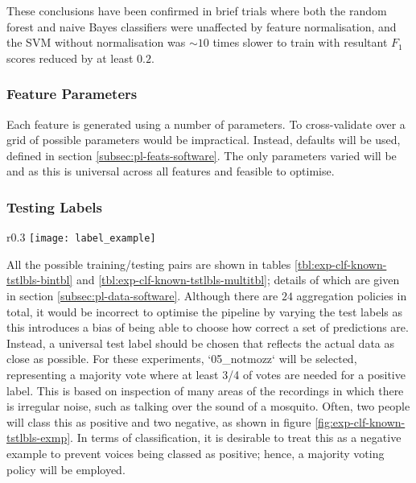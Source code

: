             These conclusions have been confirmed in brief trials where both the random forest and naive Bayes classifiers were unaffected by feature normalisation, and the SVM without normalisation was $\sim10$ times slower to train with resultant $F_{1}$ scores reduced by at least $0.2$.
    
            
        \subsubsection{Feature Parameters}
        \label{subsubsec:exp-clf-known-featparam}
            Each feature is generated using a number of parameters. To cross-validate over a grid of possible parameters would be impractical. Instead, defaults will be used, defined in section \ref{subsec:pl-feats-software}. The only parameters varied will be  and  as this is universal across all features and feasible to optimise.
        
        \subsubsection{Testing Labels}
        \label{subsubsec:exp-clf-known-tstlbls}
            \begin{wrapfigure}{r}{0.3\textwidth}
                \centering
                \texttt{[image: label\_example]}
                \caption{An example of noise where there is $50/50$ disagreement between labellers.}
                \label{fig:exp-clf-known-tstlbls-exmp}
            \end{wrapfigure}
            All the possible training/testing pairs are shown in tables \ref{tbl:exp-clf-known-tstlbls-bintbl} and \ref{tbl:exp-clf-known-tstlbls-multitbl}; details of which are given in section \ref{subsec:pl-data-software}. Although there are $24$ aggregation policies in total, it would be incorrect to optimise the pipeline by varying the test labels as this introduces a bias of being able to choose how correct a set of predictions are. Instead, a universal test label should be chosen that reflects the actual data as close as possible. For these experiments, `05\_notmozz` will be selected, representing a majority vote where at least 3/4 of votes are needed for a positive label. This is based on inspection of many areas of the recordings in which there is irregular noise, such as talking over the sound of a mosquito. Often, two people will class this as positive and two negative, as shown in figure \ref{fig:exp-clf-known-tstlbls-exmp}. In terms of classification, it is desirable to treat this as a negative example to prevent voices being classed as positive; hence, a majority voting policy will be employed.

